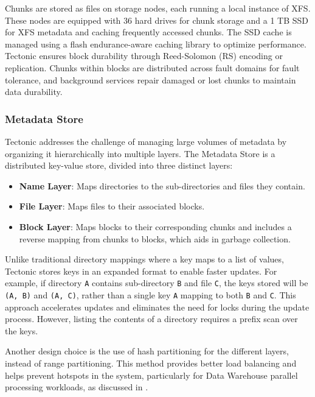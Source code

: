 Chunks are stored as files on storage nodes, each running a local instance of XFS. These nodes are equipped with 36 hard drives for chunk storage and a 1 TB SSD for XFS metadata and caching frequently accessed chunks. The SSD cache is managed using a flash endurance-aware caching library to optimize performance. Tectonic ensures block durability through Reed-Solomon (RS) encoding or replication. Chunks within blocks are distributed across fault domains for fault tolerance, and background services repair damaged or lost chunks to maintain data durability.

\subsubsection{Metadata Store}\label{sec:metadata_store}
Tectonic addresses the challenge of managing large volumes of metadata by organizing it hierarchically into multiple layers. The Metadata Store is a distributed key-value store, divided into three distinct layers:

\begin{itemize}\label{list:metadata_layers}
    \item \textbf{Name Layer}: Maps directories to the sub-directories and files they contain.
    \item \textbf{File Layer}: Maps files to their associated blocks.
    \item \textbf{Block Layer}: Maps blocks to their corresponding chunks and includes a reverse mapping from chunks to blocks, which aids in garbage collection.
\end{itemize}

Unlike traditional directory mappings where a key maps to a list of values, Tectonic stores keys in an expanded format to enable faster updates. For example, if directory \texttt{A} contains sub-directory \texttt{B} and file \texttt{C}, the keys stored will be \texttt{(A, B)} and \texttt{(A, C)}, rather than a single key \texttt{A} mapping to both \texttt{B} and \texttt{C}. This approach accelerates updates and eliminates the need for locks during the update process. However, listing the contents of a directory requires a prefix scan over the keys.

Another design choice is the use of hash partitioning for the different layers, instead of range partitioning. This method provides better load balancing and helps prevent hotspots in the system, particularly for Data Warehouse parallel processing workloads, as discussed in .


